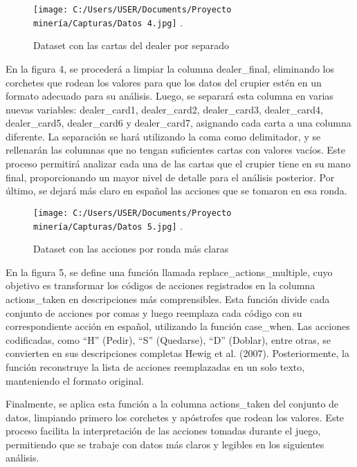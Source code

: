 \documentclass[conference,final,]{IEEEtran}
\begin{document}
\begin{figure}[htbp]
\centering
\texttt{[image: C:/Users/USER/Documents/Proyecto minería/Capturas/Datos 4.jpg]}
\DeclareGraphicsExtensions.
\caption{Dataset con las cartas del dealer por separado}
\label{Dataset 4}
\end{figure}

En la figura 4, se procederá a limpiar la columna dealer\_final,
eliminando los corchetes que rodean los valores para que los datos del
crupier estén en un formato adecuado para su análisis. Luego, se
separará esta columna en varias nuevas variables: dealer\_card1,
dealer\_card2, dealer\_card3, dealer\_card4, dealer\_card5,
dealer\_card6 y dealer\_card7, asignando cada carta a una columna
diferente. La separación se hará utilizando la coma como delimitador, y
se rellenarán las columnas que no tengan suficientes cartas con valores
vacíos. Este proceso permitirá analizar cada una de las cartas que el
crupier tiene en su mano final, proporcionando un mayor nivel de detalle
para el análisis posterior. Por último, se dejará más claro en español
las acciones que se tomaron en esa ronda.

\begin{figure}[htbp]
\centering
\texttt{[image: C:/Users/USER/Documents/Proyecto minería/Capturas/Datos 5.jpg]}
\DeclareGraphicsExtensions.
\caption{Dataset con las acciones por ronda más claras}
\label{Dataset 5}
\end{figure}

En la figura 5, se define una función llamada
replace\_actions\_multiple, cuyo objetivo es transformar los códigos de
acciones registrados en la columna actions\_taken en descripciones más
comprensibles. Esta función divide cada conjunto de acciones por comas y
luego reemplaza cada código con su correspondiente acción en español,
utilizando la función case\_when. Las acciones codificadas, como ``H''
(Pedir), ``S'' (Quedarse), ``D'' (Doblar), entre otras, se convierten en
sus descripciones completas Hewig et al. (2007). Posteriormente, la
función reconstruye la lista de acciones reemplazadas en un solo texto,
manteniendo el formato original.

Finalmente, se aplica esta función a la columna actions\_taken del
conjunto de datos, limpiando primero los corchetes y apóstrofes que
rodean los valores. Este proceso facilita la interpretación de las
acciones tomadas durante el juego, permitiendo que se trabaje con datos
más claros y legibles en los siguientes análisis.
\end{document}
